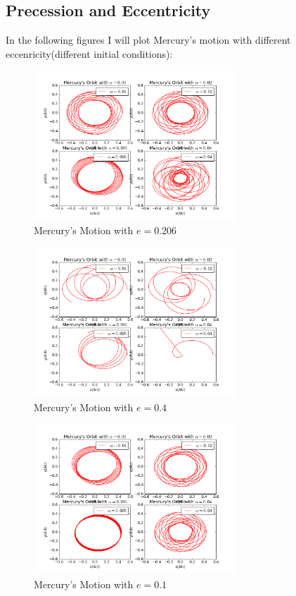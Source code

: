 \documentclass[10pt,a4paper]{article}
\begin{document}
    \subsection{Precession and Eccentricity}
    In the following figures I will plot Mercury's motion with different eccenricity(different initial conditions):\\
    \begin{figure}[htbp!]
    	\centering
    	\includegraphics[width=3in]{Mercury_4.png}
    	\caption{Mercury's Motion with $e=0.206$}
    \end{figure}
    \begin{figure}[htbp!]
    	\centering
    	\includegraphics[width=3in]{Mercury_5.png}
    	\caption{Mercury's Motion with $e=0.4$}
    \end{figure}
    \begin{figure}[htbp!]
    	\centering
    	\includegraphics[width=3in]{Mercury_6.png}
    	\caption{Mercury's Motion with $e=0.1$}
    \end{figure}
\end{document}

